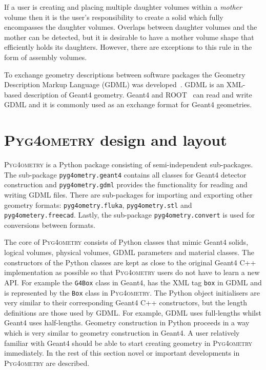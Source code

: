 \documentclass[preprint,12pt]{elsarticle}
\newcommand{\pyinline}[1]{\lstinline[postbreak={}]{#1}}
\newcommand{\PYGEOMETRY}{\textsc{Pyg4ometry}}
\begin{document}
If a user is creating and placing multiple daughter volumes within a \emph{mother} volume then it is the user's responsibility to create a solid which fully
encompasses the daughter volumes. Overlaps between daughter volumes and the mother can be detected, but it is desirable
to have a mother volume shape that efficiently holds its daughters. However, there are exceptions to this rule in the form of assembly volumes.


To exchange geometry descriptions between software packages the Geometry Description Markup Language (GDML) was developed~\cite{GDML}.
GDML is an XML-based description of Geant4 geometry. Geant4 and ROOT~\cite{fons_rademakers_2019_3895860} can read and write
GDML and it is commonly used as an exchange format for Geant4 geometries.

\section{\PYGEOMETRY{} design and layout}
\PYGEOMETRY{} is a Python package consisting of semi-independent sub-packages. The sub-package \verb|pyg4ometry.geant4| contains all classes for
Geant4 detector construction and \verb|pyg4ometry.gdml| provides the functionality for reading and writing GDML files. There are sub-packages for importing and
exporting other geometry formats: \verb|pyg4ometry.fluka|, \verb|pyg4ometry.stl| and \verb|pyg4ometery.freecad|.  Lastly, the sub-package \verb|pyg4ometry.convert|
is used for conversions between formats.

The core of \PYGEOMETRY{} consists of Python classes that mimic Geant4 solids, logical volumes, physical volumes, GDML parameters and material classes.
The constructors of the Python classes are kept as close to the original Geant4 C++ implementation as possible so that \PYGEOMETRY{} users do not have to learn
a new API. For example the \verb|G4Box| class in Geant4, has the XML tag \verb|box| in GDML and is represented by the \pyinline{Box}
class in \PYGEOMETRY{}. The Python object initialisers are very similar to their corresponding Geant4 C++ constructors, but the length definitions are those used by GDML. For example,
GDML uses full-lengths whilst Geant4 uses half-lengths. Geometry construction in Python proceeds in a way which is very similar to geometry construction in Geant4.
A user relatively familiar with Geant4 should be able to start creating geometry in \PYGEOMETRY{} immediately. In the rest of this section novel or important developments
in \PYGEOMETRY{} are described.
\end{document}
